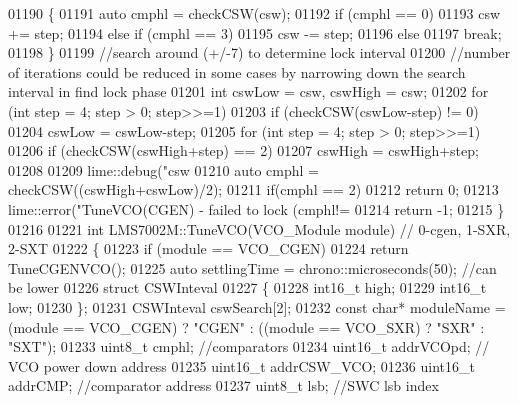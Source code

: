 \begin{DoxyCode}
{{{{{{{{{{{{{{{{{{{{{{{{{{{{{{{01190     \{
01191         \textcolor{keyword}{auto} cmphl = checkCSW(csw);
01192         \textcolor{keywordflow}{if} (cmphl == 0)
01193             csw += step;
01194         \textcolor{keywordflow}{else} \textcolor{keywordflow}{if} (cmphl == 3)
01195             csw -= step;
01196         \textcolor{keywordflow}{else}
01197             \textcolor{keywordflow}{break};
01198     \}
01199     \textcolor{comment}{//search around (+/-7) to determine lock interval}
01200     \textcolor{comment}{//number of iterations could be reduced in some cases by narrowing down the search interval in find
       lock phase}
01201     \textcolor{keywordtype}{int} cswLow = csw, cswHigh = csw;
01202     \textcolor{keywordflow}{for} (\textcolor{keywordtype}{int} step = 4; step > 0; step>>=1)
01203         \textcolor{keywordflow}{if} (checkCSW(cswLow-step) != 0)
01204             cswLow = cswLow-step;
01205     \textcolor{keywordflow}{for} (\textcolor{keywordtype}{int} step = 4; step > 0; step>>=1)
01206         \textcolor{keywordflow}{if} (checkCSW(cswHigh+step) == 2)
01207             cswHigh = cswHigh+step;
01208 
01209     lime::debug(\textcolor{stringliteral}{"csw %
01210     \textcolor{keyword}{auto} cmphl = checkCSW((cswHigh+cswLow)/2);
01211     \textcolor{keywordflow}{if}(cmphl == 2)
01212         \textcolor{keywordflow}{return} 0;
01213     lime::error(\textcolor{stringliteral}{"TuneVCO(CGEN) - failed to lock (cmphl!=%
01214     \textcolor{keywordflow}{return} -1;
01215 \}
01216 
01221 \textcolor{keywordtype}{int} LMS7002M::TuneVCO(VCO_Module module) \textcolor{comment}{// 0-cgen, 1-SXR, 2-SXT}
01222 \{
01223     \textcolor{keywordflow}{if} (module == VCO_CGEN)
01224         \textcolor{keywordflow}{return} TuneCGENVCO();
01225     \textcolor{keyword}{auto} settlingTime = chrono::microseconds(50); \textcolor{comment}{//can be lower}
01226     \textcolor{keyword}{struct }CSWInteval
01227     \{
01228         int16\_t high;
01229         int16\_t low;
01230     \};
01231     CSWInteval cswSearch[2];
01232     \textcolor{keyword}{const} \textcolor{keywordtype}{char}* moduleName = (module == VCO_CGEN) ? \textcolor{stringliteral}{"CGEN"} : ((module == VCO_SXR) ? \textcolor{stringliteral}{"SXR"} : \textcolor{stringliteral}{"SXT"});
01233     uint8\_t cmphl; \textcolor{comment}{//comparators}
01234     uint16\_t addrVCOpd; \textcolor{comment}{// VCO power down address}
01235     uint16\_t addrCSW\_VCO;
01236     uint16\_t addrCMP; \textcolor{comment}{//comparator address}
01237     uint8\_t lsb; \textcolor{comment}{//SWC lsb index}
}}}}}}}}}}}}}}}}}}}}}}}}}}}}}}}}}
\end{DoxyCode}
